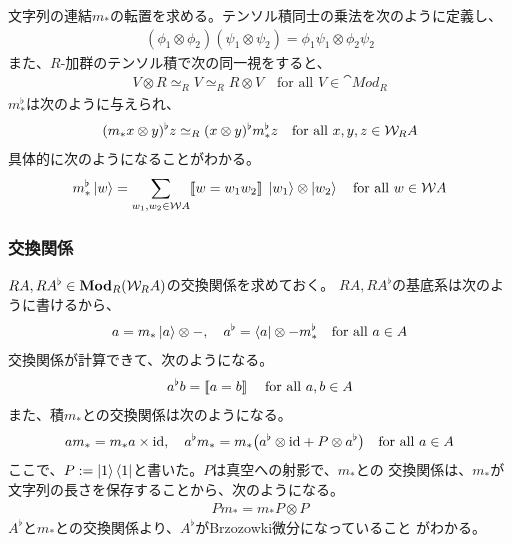 {	文字列の連結$m_*$の転置を求める。テンソル積同士の乗法を次のように定義し、
	\begin{equation*}\begin{split}
		(\phi_1\otimes\phi_2)(\psi_1\otimes\psi_2)
		= \phi_1\psi_1\otimes\phi_2\psi_2
	\end{split}\end{equation*}
	また、$R$-加群のテンソル積で次の同一視をすると、
	\begin{equation*}\begin{split}
		V\otimes R\simeq_R V\simeq_R R\otimes V 
		\quad\text{for all } V\in\cat{Mod}_R
	\end{split}\end{equation*}
	$m_*^\flat$は次のように与えられ、
	\begin{equation*}\begin{split}
		(m_*x\otimes y)^\flat z \simeq_R (x\otimes y)^\flat m_*^\flat z
		\quad\text{for all } x,y,z\in{\ensuremath{{\mathcal{W}}}}_RA
	\end{split}\end{equation*}
	具体的に次のようになることがわかる。
	\begin{equation*}\begin{split}
		m_*^\flat\mathinner{|{w}\rangle} = \sum_{w_1,w_2\in{\ensuremath{{\mathcal{W}}}} A}
		[\![w=w_1w_2]\!]\;\mathinner{|{w_1}\rangle}\otimes\mathinner{|{w_2}\rangle}
		\quad\text{for all } w\in{\ensuremath{{\mathcal{W}}}} A
	\end{split}\end{equation*}

\subsubsection{交換関係}\label{s3:交換関係} %
	$RA,RA^\flat\in{\ensuremath{\mathbf{{Mod}}}}_R({{\mathcal{W}}}_RA)$の交換関係を求めておく。
	$RA,RA^\flat$の基底系は次のように書けるから、
	\begin{equation*}\begin{split}
		a = m_*\mathinner{|{a}\rangle}\otimes-,\quad a^\flat = \mathinner{\langle{a}|}\otimes-m_*^\flat
		\quad\text{for all } a\in A
	\end{split}\end{equation*}
	交換関係が計算できて、次のようになる。
	\begin{equation*}\begin{split}
		a^\flat b = [\![a=b]\!]\; \quad\text{for all } a,b\in A
	\end{split}\end{equation*}
	また、積$m_*$との交換関係は次のようになる。
	\begin{equation*}\begin{split}
		am_* = m_*a\times{\ensuremath{\operatorname{id}}},\quad
		a^\flat m_* = m_*\bigl({a^\flat\otimes{\ensuremath{\operatorname{id}}} + P\otimes a^\flat}\bigr)
		\quad\text{for all } a\in A
	\end{split}\end{equation*}
	ここで、$P:=\mathinner{|{1}\rangle}\mathinner{\langle{1}|}$と書いた。$P$は真空への射影で、$m_*$との
	交換関係は、$m_*$が文字列の長さを保存することから、次のようになる。
	\begin{equation*}\begin{split}
		Pm_* = m_*P\otimes P
	\end{split}\end{equation*}
	$A^\flat$と$m_*$との交換関係より、$A^\flat$がBrzozowki微分になっていること
	がわかる。

}
